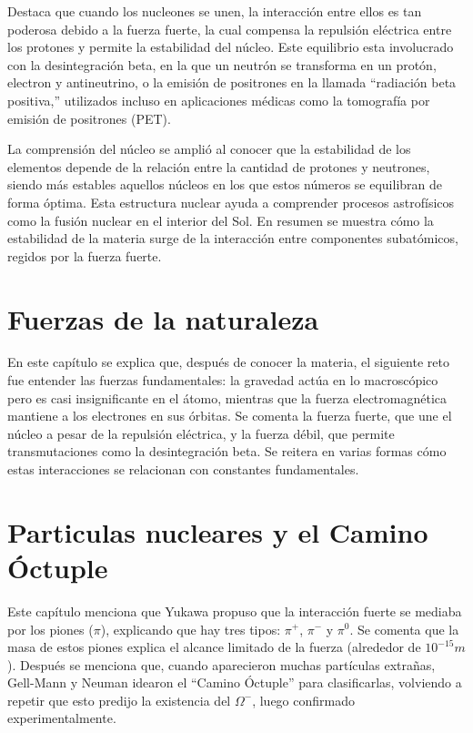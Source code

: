 \documentclass[12pt]{article}
\begin{document}
Destaca que cuando los nucleones se unen, la interacción entre ellos es tan poderosa debido a la fuerza fuerte, la cual compensa la repulsión eléctrica entre los protones y permite la estabilidad del núcleo. Este equilibrio esta involucrado con la desintegración beta, en la que un neutrón se transforma en un protón, electron y antineutrino, o la emisión de positrones en la llamada “radiación beta positiva,” utilizados incluso en aplicaciones médicas como la tomografía por emisión de positrones (PET).

La comprensión del núcleo se amplió al conocer que la estabilidad de los elementos depende de la relación entre la cantidad de protones y neutrones, siendo más estables aquellos núcleos en los que estos números se equilibran de forma óptima. Esta estructura nuclear ayuda a comprender procesos astrofísicos como la fusión nuclear en el interior del Sol. En resumen se muestra cómo la estabilidad de la materia surge de la interacción entre componentes subatómicos, regidos por la fuerza fuerte.

\section{Fuerzas de la naturaleza}
En este capítulo se explica que, después de conocer la materia, el siguiente reto fue entender las fuerzas fundamentales: la gravedad actúa en lo macroscópico pero es casi insignificante en el átomo, mientras que la fuerza electromagnética mantiene a los electrones en sus órbitas. Se comenta la fuerza fuerte, que une el núcleo a pesar de la repulsión eléctrica, y la fuerza débil, que permite transmutaciones como la desintegración beta. Se reitera en varias formas cómo estas interacciones se relacionan con constantes fundamentales.

\section{Particulas nucleares y el Camino Óctuple}
Este capítulo menciona que Yukawa propuso que la interacción fuerte se mediaba por los piones ($\pi$), explicando que hay tres tipos: $\pi^{+}$, $\pi^{-}$ y $\pi^{0}$. Se comenta que la masa de estos piones explica el alcance limitado de la fuerza (alrededor de $10^{-15} m$). Después se menciona que, cuando aparecieron muchas partículas extrañas, Gell-Mann y Neuman idearon el “Camino Óctuple” para clasificarlas, volviendo a repetir que esto predijo la existencia del $\Omega^{-}$, luego confirmado experimentalmente.
\end{document}
